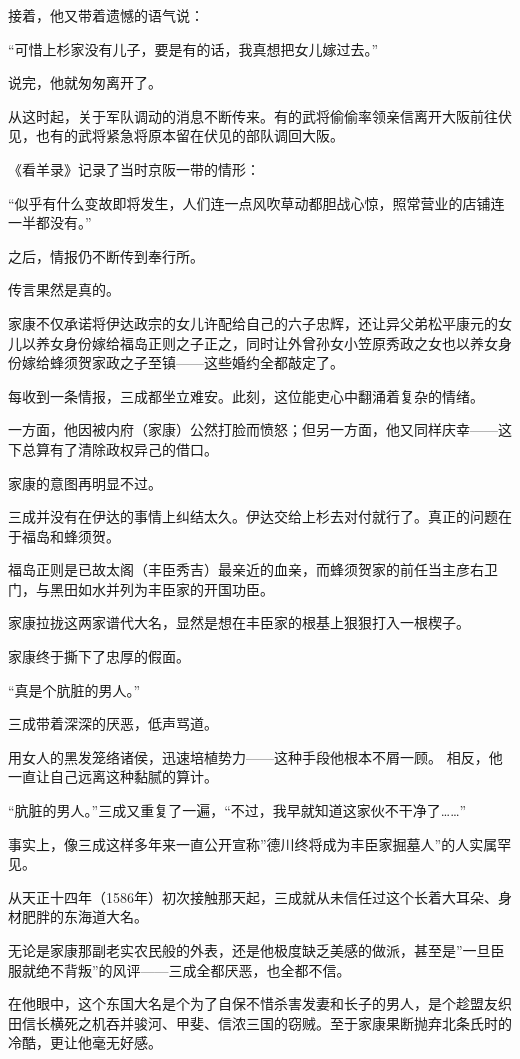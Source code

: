 \documentclass[
]{book}
\begin{document}
接着，他又带着遗憾的语气说：

``可惜上杉家没有儿子，要是有的话，我真想把女儿嫁过去。''

说完，他就匆匆离开了。

从这时起，关于军队调动的消息不断传来。有的武将偷偷率领亲信离开大阪前往伏见，也有的武将紧急将原本留在伏见的部队调回大阪。

《看羊录》记录了当时京阪一带的情形：

``似乎有什么变故即将发生，人们连一点风吹草动都胆战心惊，照常营业的店铺连一半都没有。''

之后，情报仍不断传到奉行所。

传言果然是真的。

家康不仅承诺将伊达政宗的女儿许配给自己的六子忠辉，还让异父弟松平康元的女儿以养女身份嫁给福岛正则之子正之，同时让外曾孙女小笠原秀政之女也以养女身份嫁给蜂须贺家政之子至镇------这些婚约全都敲定了。

每收到一条情报，三成都坐立难安。此刻，这位能吏心中翻涌着复杂的情绪。

一方面，他因被内府（家康）公然打脸而愤怒；但另一方面，他又同样庆幸------这下总算有了清除政权异己的借口。

家康的意图再明显不过。

三成并没有在伊达的事情上纠结太久。伊达交给上杉去对付就行了。真正的问题在于福岛和蜂须贺。

福岛正则是已故太阁（丰臣秀吉）最亲近的血亲，而蜂须贺家的前任当主彦右卫门，与黑田如水并列为丰臣家的开国功臣。

家康拉拢这两家谱代大名，显然是想在丰臣家的根基上狠狠打入一根楔子。

家康终于撕下了忠厚的假面。

``真是个肮脏的男人。''

三成带着深深的厌恶，低声骂道。

用女人的黑发笼络诸侯，迅速培植势力------这种手段他根本不屑一顾。 相反，他一直让自己远离这种黏腻的算计。

``肮脏的男人。''三成又重复了一遍，``不过，我早就知道这家伙不干净了\ldots\ldots{}''

事实上，像三成这样多年来一直公开宣称''德川终将成为丰臣家掘墓人''的人实属罕见。

从天正十四年（1586年）初次接触那天起，三成就从未信任过这个长着大耳朵、身材肥胖的东海道大名。

无论是家康那副老实农民般的外表，还是他极度缺乏美感的做派，甚至是''一旦臣服就绝不背叛''的风评------三成全都厌恶，也全都不信。

在他眼中，这个东国大名是个为了自保不惜杀害发妻和长子的男人，是个趁盟友织田信长横死之机吞并骏河、甲斐、信浓三国的窃贼。至于家康果断抛弃北条氏时的冷酷，更让他毫无好感。
\end{document}
